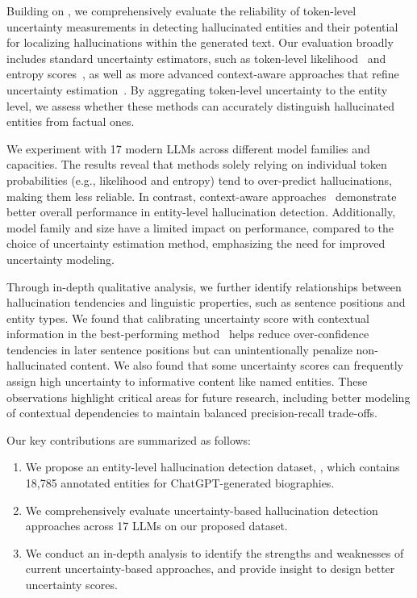 Building on \dataset, we comprehensively evaluate the reliability of token-level uncertainty measurements in detecting hallucinated entities and their potential for localizing hallucinations within the generated text. 
Our evaluation broadly includes standard uncertainty estimators, such as token-level likelihood~\citep{guerreiro-etal-2023-looking} and entropy scores~\citep{malinin2021uncertainty}, as well as more advanced context-aware approaches that refine uncertainty estimation~\citep{fadeeva-etal-2024-fact, duan-etal-2024-shifting, zhang-etal-2023-enhancing-uncertainty}. By aggregating token-level uncertainty to the entity level, we assess whether these methods can accurately distinguish hallucinated entities from factual ones. {We experiment with 17 modern LLMs across different model families and capacities. The results reveal that methods solely relying on individual token probabilities (e.g., likelihood and entropy) tend to over-predict hallucinations, making them less reliable. In contrast, context-aware approaches~\citep{duan-etal-2024-shifting, zhang-etal-2023-enhancing-uncertainty}  demonstrate better overall performance in entity-level hallucination detection.
Additionally, model family and size have a limited impact on performance, compared to the choice of uncertainty estimation method, emphasizing the need for improved uncertainty modeling. 

Through in-depth qualitative analysis, we further identify relationships between hallucination tendencies and linguistic properties, such as sentence positions and entity types. We found that calibrating uncertainty score with contextual information in the best-performing method~\cite{zhang-etal-2023-enhancing-uncertainty} helps reduce over-confidence tendencies in later sentence positions but can unintentionally penalize non-hallucinated content. 
We also found that some uncertainty scores can frequently assign high uncertainty to informative content like named entities. These observations highlight  critical areas for future research, including better modeling of contextual dependencies to maintain balanced precision-recall trade-offs.} Our key contributions are summarized as follows:




\begin{enumerate}[nosep]
    \item We propose an entity-level hallucination detection dataset, \dataset, which contains 18,785 annotated entities for ChatGPT-generated biographies.
    \item We comprehensively evaluate uncertainty-based hallucination detection approaches {across 17 LLMs} on our proposed dataset.
    \item We conduct an in-depth analysis to identify the strengths and weaknesses of current uncertainty-based approaches, and provide insight to design better uncertainty scores.
\end{enumerate}

